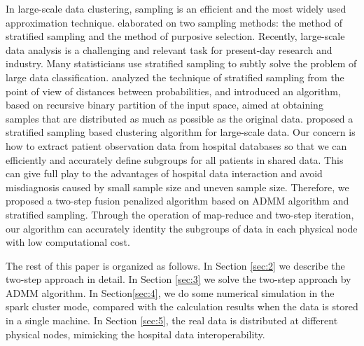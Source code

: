 \documentclass[review]{elsarticle}
\begin{document}
In large-scale data clustering, sampling is an efficient and the most widely used approximation technique. \cite{neyman1934two} elaborated on two sampling methods: the method of stratified sampling and the method of purposive selection. Recently, large-scale data analysis is a challenging and relevant task for present-day research and industry. Many statisticians use stratified sampling to subtly solve the problem of large data classification. \cite{cervellera2018distribution} analyzed the technique of stratified sampling from the point of view of distances between probabilities, and introduced an algorithm, based on recursive binary partition of the input space, aimed at obtaining samples that are distributed as much as possible as the original data.  \cite{zhao2019stratified} proposed a stratified sampling based clustering algorithm for large-scale data. Our concern is how to extract patient observation data from hospital databases so that we can efficiently and accurately define subgroups for all patients in shared data. This can give full play to the advantages of hospital data interaction and avoid misdiagnosis caused by small sample size and uneven sample size. Therefore, we proposed a two-step fusion penalized algorithm based on ADMM algorithm and stratified sampling. Through the operation of map-reduce and two-step iteration, our algorithm can accurately identity the subgroups of data in each physical node with low computational cost.

The rest of this paper is organized as follows. In Section \ref{sec:2} we describe the two-step approach in detail. In Section \ref{sec:3} we solve the two-step approach by ADMM algorithm. In Section\ref{sec:4}, we do some numerical simulation in the spark cluster mode, compared with the calculation results when the data is stored in a single machine. In Section \ref{sec:5}, the real data is distributed at different physical nodes, mimicking the hospital data interoperability.
\end{document}
